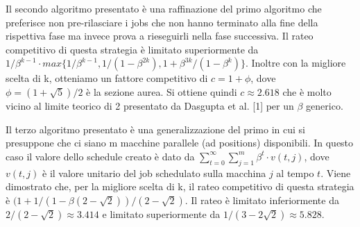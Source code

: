 \documentclass[12pt]{article}
\begin{document}
Il secondo algoritmo presentato è una raffinazione del primo algoritmo che preferisce non pre-rilasciare i jobs che non hanno terminato alla fine della rispettiva fase ma invece prova a rieseguirli nella fase successiva. Il rateo competitivo di questa strategia è limitato superiormente da $1/\beta^{k-1} \cdot max\{1/\beta^{k-1}, 1/(1 - \beta^{2k} ), 1 + \beta^{3k}/(1 - \beta^{k} )\}$. Inoltre con la migliore scelta di k, otteniamo un fattore competitivo di $c = 1 + \phi$, dove $\phi = (1 + \sqrt{5})/2$ è la sezione aurea. Si ottiene quindi $c \approx 2.618$ che è molto vicino al limite teorico di 2 presentato da Dasgupta et al. [1] per un $\beta$ generico.

Il terzo algoritmo presentato è una generalizzazione del primo in cui si presuppone che ci siano m macchine parallele (ad positions) disponibili. In questo caso il valore dello schedule creato è dato da $\sum_ {t = 0}^{\infty}\sum_{j = 1}^{m}\beta^{t}\cdot v(t,j)$, dove $v(t,j)$ è il valore unitario del job schedulato sulla macchina $j$ al tempo $t$. Viene dimostrato che, per la migliore scelta di k, il rateo competitivo di questa strategia è $(1 + 1/(1 - \beta(2 - \sqrt{2}))/(2 - \sqrt{2})$. Il rateo è limitato inferiormente da $2/(2-\sqrt{2}) \approx 3.414$ e limitato superiormente da $1/(3 - 2\sqrt{2}) \approx 5.828$.
\end{document}
